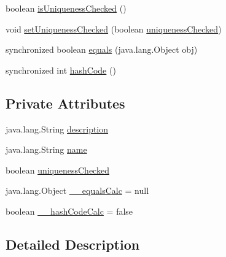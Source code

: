 \begin{DoxyCompactItemize}
\item 
boolean \hyperlink{classorg_1_1glite_1_1security_1_1voms_1_1service_1_1attributes_1_1AttributeClass_a59f5201026ab869e6f104d667cad85ce}{isUniquenessChecked} ()
\item 
void \hyperlink{classorg_1_1glite_1_1security_1_1voms_1_1service_1_1attributes_1_1AttributeClass_ad3851f5a0db2aaf3c7d942368083b09f}{setUniquenessChecked} (boolean \hyperlink{classorg_1_1glite_1_1security_1_1voms_1_1service_1_1attributes_1_1AttributeClass_a042045180f498b121edf4387254a6485}{uniquenessChecked})
\item 
synchronized boolean \hyperlink{classorg_1_1glite_1_1security_1_1voms_1_1service_1_1attributes_1_1AttributeClass_a098cf5b6b36daa71ffbed1c735217dae}{equals} (java.lang.Object obj)
\item 
synchronized int \hyperlink{classorg_1_1glite_1_1security_1_1voms_1_1service_1_1attributes_1_1AttributeClass_a753c75691c2c94086f480373cdfee84d}{hashCode} ()
\end{DoxyCompactItemize}
\subsection*{Private Attributes}
\begin{DoxyCompactItemize}
\item 
java.lang.String \hyperlink{classorg_1_1glite_1_1security_1_1voms_1_1service_1_1attributes_1_1AttributeClass_a801f19a4afcc37f43430a6e4f56e8cff}{description}
\item 
java.lang.String \hyperlink{classorg_1_1glite_1_1security_1_1voms_1_1service_1_1attributes_1_1AttributeClass_a82b753e3485022060f07c71a2060d8e6}{name}
\item 
boolean \hyperlink{classorg_1_1glite_1_1security_1_1voms_1_1service_1_1attributes_1_1AttributeClass_a042045180f498b121edf4387254a6485}{uniquenessChecked}
\item 
java.lang.Object \hyperlink{classorg_1_1glite_1_1security_1_1voms_1_1service_1_1attributes_1_1AttributeClass_ad1e5727edef511b4396776dc1bc4ee16}{\_\-\_\-equalsCalc} = null
\item 
boolean \hyperlink{classorg_1_1glite_1_1security_1_1voms_1_1service_1_1attributes_1_1AttributeClass_a192486574f7af02630f61d253260c895}{\_\-\_\-hashCodeCalc} = false
\end{DoxyCompactItemize}


\subsection{Detailed Description}



